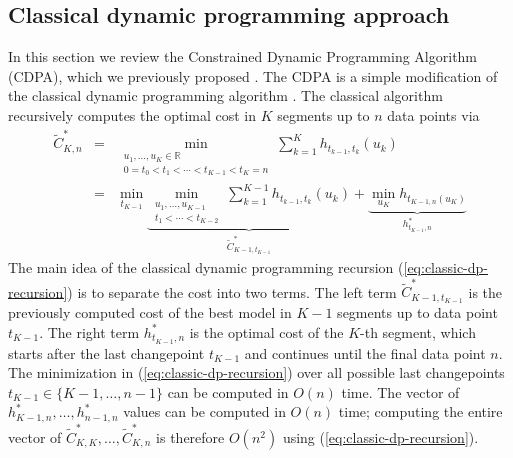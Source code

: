 \documentclass[twoside,11pt]{article}
\newcommand{\RR}{\mathbb R}
\begin{document}


\subsection{Classical dynamic programming approach}

In this section we review the Constrained Dynamic Programming
Algorithm (CDPA), which we previously proposed
\citep{HOCKING-PeakSeg}. The CDPA is a simple modification of the
classical dynamic programming algorithm
\citep{segment-neighborhood}. The classical algorithm recursively
computes the optimal cost in $K$ segments up to $n$ data points via
\begin{eqnarray}
  \tilde{C}^*_{K,n} 
&=& \min_{\substack{
u_1,\dots,u_{K}\in\RR
\\
0=t_0<t_1<\cdots<t_{K-1}<t_K=n
}}
  \sum_{k=1}^K
  h_{t_{k-1}, t_k}(u_k)\\
&=& \min_{t_{K-1}} 
\underbrace{
    \min_{\substack{
    u_1,\dots,u_{K-1}
  \\
  t_1<\cdots<t_{K-2}
  }} \sum_{k=1}^{K-1} h_{t_{k-1},t_k}(u_k)
}_{\tilde{C}^*_{K-1,t_{K-1}}}
+ \underbrace{
  \min_{u_K} h_{t_{K-1,n}(u_K)}
}_{h^*_{t_{K-1},n}}
\label{eq:classic-dp-recursion}
\end{eqnarray}
The main idea of the classical dynamic programming recursion
(\ref{eq:classic-dp-recursion}) is to separate the cost into two
terms. The left term $\tilde{C}^*_{K-1,t_{K-1}}$ is the previously
computed cost of the best model in $K-1$ segments up to data point
$t_{K-1}$. The right term $h^*_{t_{K-1},n}$ is the optimal cost of the
$K$-th segment, which starts after the last changepoint $t_{K-1}$ and
continues until the final data point $n$. The minimization in
(\ref{eq:classic-dp-recursion}) over all possible last changepoints
$t_{K-1}\in\{K-1, \dots, n-1\}$ can be computed in $O(n)$ time. The vector of
$h^*_{K-1,n},\dots,h^*_{n-1,n}$ values can be computed in $O(n)$
time; computing the entire vector of
$\tilde{C}^*_{K,K},\dots,\tilde{C}^*_{K,n}$ is therefore $O(n^2)$ using
(\ref{eq:classic-dp-recursion}). 
\end{document}
